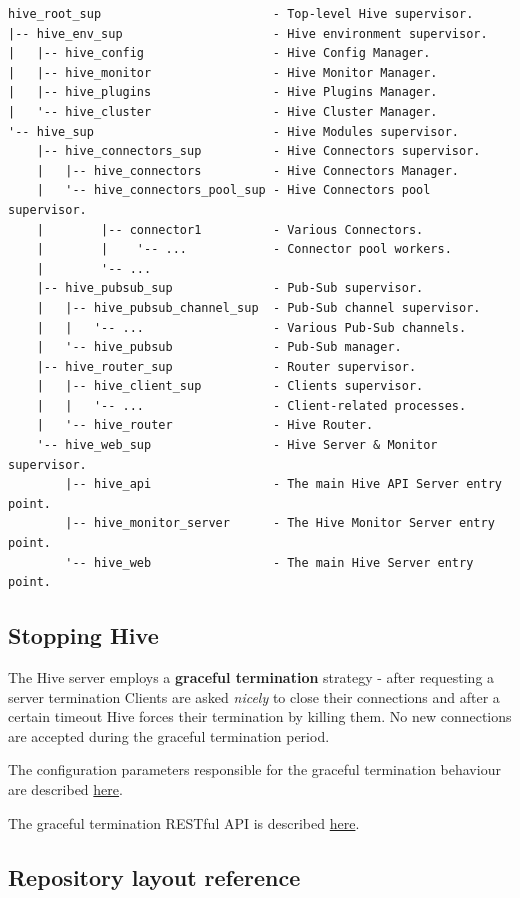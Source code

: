 \documentclass[a4paper]{article}
\begin{document}
\begin{verbatim}
hive_root_sup                        - Top-level Hive supervisor.
|-- hive_env_sup                     - Hive environment supervisor.
|   |-- hive_config                  - Hive Config Manager.
|   |-- hive_monitor                 - Hive Monitor Manager.
|   |-- hive_plugins                 - Hive Plugins Manager.
|   '-- hive_cluster                 - Hive Cluster Manager.
'-- hive_sup                         - Hive Modules supervisor.
    |-- hive_connectors_sup          - Hive Connectors supervisor.
    |   |-- hive_connectors          - Hive Connectors Manager.
    |   '-- hive_connectors_pool_sup - Hive Connectors pool supervisor.
    |        |-- connector1          - Various Connectors.
    |        |    '-- ...            - Connector pool workers.
    |        '-- ...
    |-- hive_pubsub_sup              - Pub-Sub supervisor.
    |   |-- hive_pubsub_channel_sup  - Pub-Sub channel supervisor.
    |   |   '-- ...                  - Various Pub-Sub channels.
    |   '-- hive_pubsub              - Pub-Sub manager.
    |-- hive_router_sup              - Router supervisor.
    |   |-- hive_client_sup          - Clients supervisor.
    |   |   '-- ...                  - Client-related processes.
    |   '-- hive_router              - Hive Router.
    '-- hive_web_sup                 - Hive Server & Monitor supervisor.
        |-- hive_api                 - The main Hive API Server entry point.
        |-- hive_monitor_server      - The Hive Monitor Server entry point.
        '-- hive_web                 - The main Hive Server entry point.
\end{verbatim}
\subsection{Stopping Hive}
\label{sec-2-4}

The Hive server employs a \textbf{graceful termination} strategy - after requesting a server termination Clients are asked \emph{nicely} to close their connections and after a certain timeout Hive forces their termination by killing them. No new connections are accepted during the graceful termination period.

\noindent
The configuration parameters responsible for the graceful termination behaviour are described \hyperref[ref-graceful_config]{here}.

\noindent
The graceful termination RESTful API is described \hyperref[sec-6-1-1]{here}.
\subsection{Repository layout reference}
\label{sec-2-5}
\end{document}
